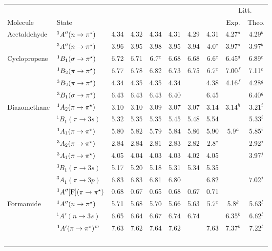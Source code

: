 \begin{tabular}{ll|ccc|ccc|cc}
        &		& \multicolumn{3}{c}{\AVDZ} & \multicolumn{3}{c}{\AVTZ} & \multicolumn{2}{c}{Litt.}\\
  Molecule &State 	& {\CC{3}} & {\CCSDT}  &  {\exCI} & {\CC{3}} & {\CCSDT}  & {\exCI}& Exp. & Theo. \\
    Acetaldehyde	&$^1A'' (n \rightarrow \pis)$			&4.34&4.32&4.34&	4.31&4.29&4.31	& 4.27$^a$ &4.29$^b$	\\
        &$^3A'' (n \rightarrow \pis)$			&3.96&3.95&3.98&	3.95&3.94&4.0$^c$  & 3.97$^a$ &3.97$^b$	\\
    Cyclopropene	&$^1B_1 (\sigma \rightarrow \pis)$		&6.72&6.71&6.7$^c$&6.68&6.68&6.6$^c$& 6.45$^d$ & 6.89$^e$	\\
        &$^1B_2 (\pi \rightarrow \pis)$			&6.77&6.78&6.82&	6.73&6.75&6.7$^c$	& 7.00$^f$  & 7.11$^e$	\\
        &$^3B_2 (\pi \rightarrow \pis)$			&4.34&4.35&4.35&	4.34&	&4.38	& 4.16$^f$  & 4.28$^g$	\\
        &$^3B_1 (\sigma \rightarrow \pis)$		&6.43&6.43&6.43&	6.40&	&6.45	&		  & 6.40$^g$	\\
    Diazomethane	&$^1A_2 (\pi \rightarrow \pis)$ 			&3.10&3.10&3.09&	3.07&3.07&3.14	& 3.14$^h$ &3.21$^i$	\\
        &$^1B_1 (\pi \rightarrow 3s)$ 			&5.32&5.35&5.35&	5.45&5.48&5.54	&		   &5.33$^i$	\\
        &$^1A_1 (\pi \rightarrow \pis)$			&5.80&5.82&5.79&	5.84&5.86&5.90	& 5.9$^h$	   &5.85$^i$	\\
        &$^3A_2 (\pi \rightarrow \pis)$ 			&2.84&2.84&2.81&	2.83&2.82&2.8$^c$	&		   &2.92$^j$	\\
        &$^3A_1 (\pi \rightarrow \pis)$			&4.05&4.04&4.03&	4.03&4.02&4.05	&		   &3.97$^j$	\\
        &$^3B_1 (\pi \rightarrow 3s)$ 			&5.17&5.20&5.18&	5.31&5.34&5.35	&		   &			\\
        &$^3A_1 (\pi \rightarrow 3p)$			&6.83&6.83&6.81&	6.80&       &6.82	&		   &7.02$^j$	\\
        &$^1A'' [\mathrm{F}]	(\pi \rightarrow \pis)$	&0.68&0.67&0.65&	0.68&0.67&0.71	&	 	   &			\\
    Formamide	&$^1A'' (n \rightarrow \pis)$			&5.71&5.68&5.70	&5.66&5.63&5.7$^c$&5.8$^k$		&5.63$^l$	\\
        &$^1A' (n \rightarrow 3s)$				&6.65&6.64&6.67	&6.74&6.74&		&6.35$^k$	&6.62$^l$	\\	
        &$^1A' (\pi \rightarrow \pis)$$^m$		&7.63&7.62&7.64	&7.62&	&7.63	&7.37$^k$	&7.22$^l$	\\
$$
\end{tabular}
